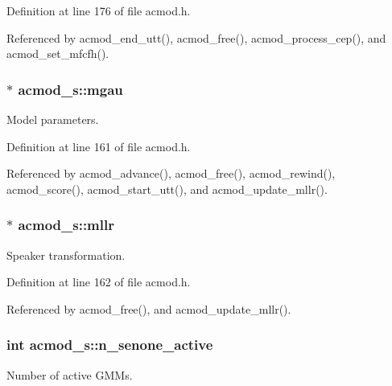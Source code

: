 Definition at line 176 of file acmod.\-h.



Referenced by acmod\-\_\-end\-\_\-utt(), acmod\-\_\-free(), acmod\-\_\-process\-\_\-cep(), and acmod\-\_\-set\-\_\-mfcfh().

\subsubsection[{mgau}]{$\ast$ acmod\-\_\-s\-::mgau}\label{structacmod__s_a023addd9fe7252d87c683e02485cdafd}


Model parameters. 



Definition at line 161 of file acmod.\-h.



Referenced by acmod\-\_\-advance(), acmod\-\_\-free(), acmod\-\_\-rewind(), acmod\-\_\-score(), acmod\-\_\-start\-\_\-utt(), and acmod\-\_\-update\-\_\-mllr().

\subsubsection[{mllr}]{$\ast$ acmod\-\_\-s\-::mllr}\label{structacmod__s_a4edbfa1a1324c6db27b74de7d0158e5e}


Speaker transformation. 



Definition at line 162 of file acmod.\-h.



Referenced by acmod\-\_\-free(), and acmod\-\_\-update\-\_\-mllr().

\subsubsection[{n\-\_\-senone\-\_\-active}]{\setlength{\rightskip}{0pt plus 5cm}int acmod\-\_\-s\-::n\-\_\-senone\-\_\-active}\label{structacmod__s_a5081a507e3ca6de6c5695217245dc9f9}


Number of active G\-M\-Ms. 



